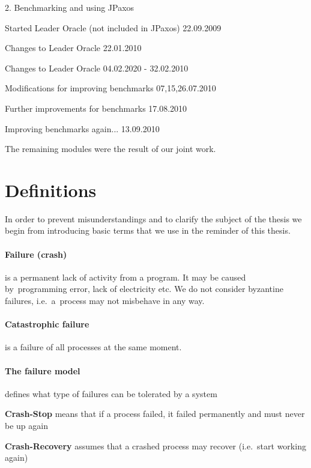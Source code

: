 \begin{tightList}
  \item[2. ] Benchmarking and using JPaxos
  \begin{tightList}
    \item[\textbullet] Started Leader Oracle (not included in JPaxos) 22.09.2009
    \item[\textbullet] Changes to Leader Oracle 22.01.2010
    \item[\textbullet] Changes to Leader Oracle 04.02.2020 - 32.02.2010
    \item[\textbullet] Modifications for improving benchmarks 07,15,26.07.2010
    \item[\textbullet] Further improvements for benchmarks 17.08.2010
    \item[\textbullet] Improving benchmarks again... 13.09.2010
  \end{tightList}
\end{tightList}


\noindent The remaining modules were the result of our joint work.


\clearpage

\section{Definitions}

In order to prevent misunderstandings and to clarify the subject of the thesis we begin from introducing
basic terms that we use in the reminder of this thesis.

\paragraph{Failure (crash)}
is a permanent lack of activity from a program. It may be caused by~programming error, lack of electricity etc.
We do not consider byzantine failures, i.e.~a~process may not misbehave in any way.

\paragraph{Catastrophic failure} is a failure of all processes at the same moment.

\paragraph{The failure model}
defines what type of failures can be tolerated by a system
\begin{tightList}[ \setlength{\leftmargin}{2\leftmargin}]
 \item[\textbf{Crash-Stop}] means that if a process failed, it failed permanently and must never be up again
 \item[\textbf{Crash-Recovery}] assumes that a crashed process may recover (i.e.\ start working again)
\end{tightList}

